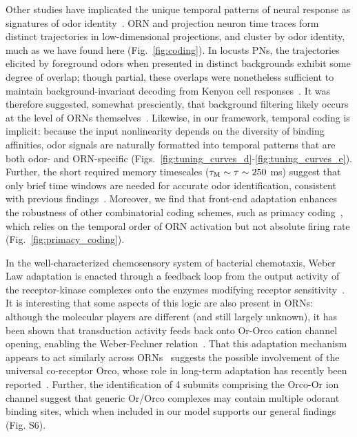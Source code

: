 \documentclass[10pt,prl,aps,showpacs,twocolumn,unsortedaddress]{revtex4-1}
\begin{document}
Other studies have implicated the unique temporal patterns of neural response as signatures of odor identity~\cite{stopfer_temporal_model, multiple_timescales_stopfer, stopfer_nat_neuro, stopfer_temporal_channel}. ORN and projection neuron time traces form distinct trajectories in low-dimensional projections, and cluster by odor identity, much as we have found here (Fig.~\ref{fig:coding}). In locusts PNs, the trajectories elicited by foreground odors when presented in distinct backgrounds exhibit some degree of overlap; though partial, these overlaps were nonetheless sufficient to maintain background-invariant decoding from Kenyon cell responses~\cite{coding_background}. It was therefore suggested, somewhat presciently, that background filtering likely occurs at the level of ORNs themselves~\cite{coding_background}. Likewise, in our framework, temporal coding is implicit: because the input nonlinearity depends on the diversity of binding affinities, %
odor signals are naturally formatted into temporal patterns that are both odor- and ORN-specific  (Figs.~\ref{fig:tuning_curves_d}-\ref{fig:tuning_curves_e}). Further, the short required memory timescales  ($\tau_{\textup M} \sim \tau \sim 250$ ms) suggest that only brief time windows are needed for accurate odor identification, consistent with previous findings~\cite{stopfer_nat_neuro, coding_background}. Moreover, we find that front-end adaptation enhances the robustness of other combinatorial coding schemes, such as primacy coding~\cite{primacy_coding}, which relies on the temporal order of ORN activation but not absolute firing rate (Fig.~\ref{fig:primacy_coding}).

In the well-characterized chemosensory system of bacterial chemotaxis, Weber Law adaptation is enacted through a feedback loop from the output activity of the receptor-kinase complexes onto the enzymes modifying receptor sensitivity~\cite{EmonetReview}. It is interesting that some aspects of this logic are also present in ORNs: although the molecular players are different (and still largely unknown), it has been shown that transduction activity feeds back onto Or-Orco cation channel opening, enabling the Weber-Fechner relation~\cite{nagel_wilson_biophysical,srinivas_elife,cao_WL}. 
That this adaptation mechanism appears to act similarly across ORNs~\cite{srinivas_elife,martelli,cao_WL} suggests the possible involvement of the universal co-receptor Orco, whose role in long-term adaptation has recently been reported~\cite{getahun2013insect,getahun2016intracellular,Guo_Smith}. Further, the identification of 4 subunits comprising the Orco-Or ion channel suggest that generic Or/Orco complexes may contain multiple odorant binding sites, which when included in our model supports our general findings (Fig. S6).
\end{document}
